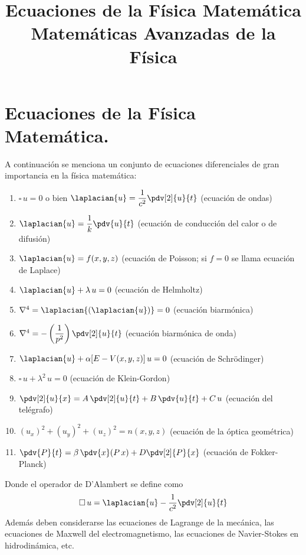
\author{}
\usepackage{tikz-3dplot}
\title{Ecuaciones de la Física Matemática \\ {\large Matemáticas Avanzadas de la Física}\vspace{-1.5\baselineskip}}
\date{}
\author{}

\maketitle
\fontsize{14}{14}\selectfont
\section{Ecuaciones de la Física Matemática.}
A continuación se menciona un conjunto de ecuaciones diferenciales de gran importancia en la física matemática:
\begin{enumerate}[label=\alph*)]
\item $\square \, u = 0$ o bien $\laplacian{u} = \dfrac{1}{c^{2}} \displaystyle \pdv[2]{u}{t}$ (ecuación de ondas)
\item $\laplacian{u} = \dfrac{1}{k} \displaystyle \pdv{u}{t}$ (ecuación de conducción del calor o de difusión)
\item $\laplacian{u} = f(x, y, z)$ (ecuación de Poisson; si $f=0$ se llama ecuación de Laplace)
\item $\laplacian{u} + \lambda \, u = 0$ (ecuación de Helmholtz)
\item $\nabla^{4} = \laplacian{(\laplacian{u})} = 0$ (ecuación biarmónica)
\item $\nabla^{4} = - \left( \dfrac{1}{p^{2}} \right) \displaystyle \pdv[2]{u}{t}$ (ecuación biarmónica de onda)
\item $\laplacian{u} + \alpha [E - V(x, y, z)] \, u = 0$ (ecuación de Schrödinger)
\item $\square \, u + \lambda^{2} \, u = 0$ (ecuación de Klein-Gordon)
\item $\displaystyle \pdv[2]{u}{x} = A \, \displaystyle \pdv[2]{u}{t} + B \, \displaystyle \pdv{u}{t} + C \, u$ (ecuación del telégrafo)
\item $(u_{x})^{2} + (u_{y})^{2} + (u_{z})^{2} =  n (x, y, z)$ (ecuación de la óptica geométrica)
\item $\displaystyle \pdv{P}{t} = \beta \, \displaystyle \pdv{x} (P \, x) +  D \displaystyle \pdv[2]{P}{x}$ (ecuación de Fokker-Planck)
\end{enumerate}
Donde el operador de D'Alambert se define como
\begin{align*}
\square \, u = \laplacian{u} - \dfrac{1}{c^{2}} \pdv[2]{u}{t}
\end{align*}
Además deben considerarse las ecuaciones de Lagrange de la mecánica, las ecuaciones de Maxwell del electromagnetismo, las ecuaciones de Navier-Stokes en hidrodinámica, etc.
